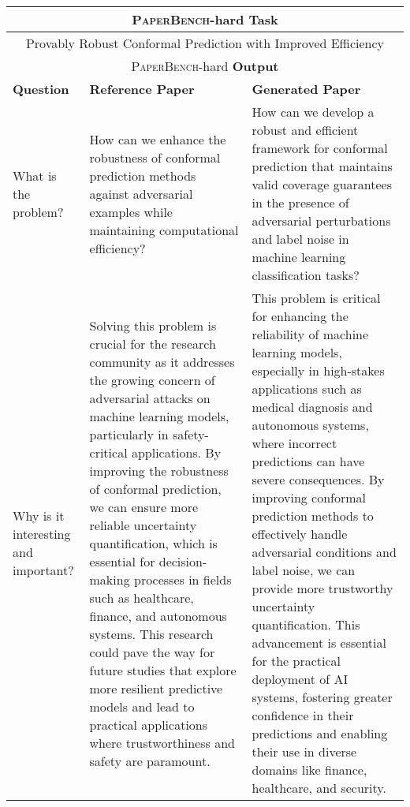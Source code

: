 \begin{table*}[htbp]
\centering
\scriptsize
\begin{tabular}{p{3cm}p{6cm}p{6cm}}
\toprule[1.1pt]
\multicolumn{3}{c}{\textsc{PaperBench}-hard \textbf{Task}} \\ \midrule
\multicolumn{3}{c}{Provably Robust Conformal Prediction with Improved Efficiency} \\ \midrule
\multicolumn{3}{c}{\textsc{PaperBench}-hard \textbf{Output}} \\ \midrule
\textbf{Question} & \textbf{Reference Paper} & \textbf{Generated Paper} \\ \midrule
What is the problem? & 
How can we enhance the robustness of conformal prediction methods against adversarial examples while maintaining computational efficiency? &
How can we develop a robust and efficient framework for conformal prediction that maintains valid coverage guarantees in the presence of adversarial perturbations and label noise in machine learning classification tasks? \\ \midrule

Why is it interesting and important? & 
Solving this problem is crucial for the research community as it addresses the growing concern of adversarial attacks on machine learning models, particularly in safety-critical applications. By improving the robustness of conformal prediction, we can ensure more reliable uncertainty quantification, which is essential for decision-making processes in fields such as healthcare, finance, and autonomous systems. This research could pave the way for future studies that explore more resilient predictive models and lead to practical applications where trustworthiness and safety are paramount. &
This problem is critical for enhancing the reliability of machine learning models, especially in high-stakes applications such as medical diagnosis and autonomous systems, where incorrect predictions can have severe consequences. By improving conformal prediction methods to effectively handle adversarial conditions and label noise, we can provide more trustworthy uncertainty quantification. This advancement is essential for the practical deployment of AI systems, fostering greater confidence in their predictions and enabling their use in diverse domains like finance, healthcare, and security.
\\ \midrule


\end{tabular}
\end{table*}
